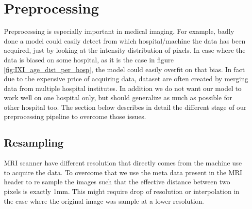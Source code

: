 \section{Preprocessing}
Preprocessing is especially important in medical imaging. For example, badly done a model could easily detect from which hospital/machine the data has been acquired, just by looking at the intensity distribution of pixels. In case where the data is biased on some hospital, as it is the case in figure \ref{fig:IXI_age_dist_per_hosp},  the model could easily overfit on that bias. In fact due to the expensive price of acquiring data, dataset are often created by merging data from multiple hospital institutes. In addition we do not want our model to work well on one hospital only, but should generalize as much as possible for other hospital too. The section below describes in detail the different stage of our preprocessing pipeline to overcome those issues.


\subsection{Resampling}
MRI scanner have different resolution that directly comes from the machine use to acquire the data. To overcome that we use the meta data present in the MRI header to re sample the images such that the effective distance between two pixels is exactly 1mm. This might require drop of resolution or interpolation in the case where the original image was sample at a lower resolution.


